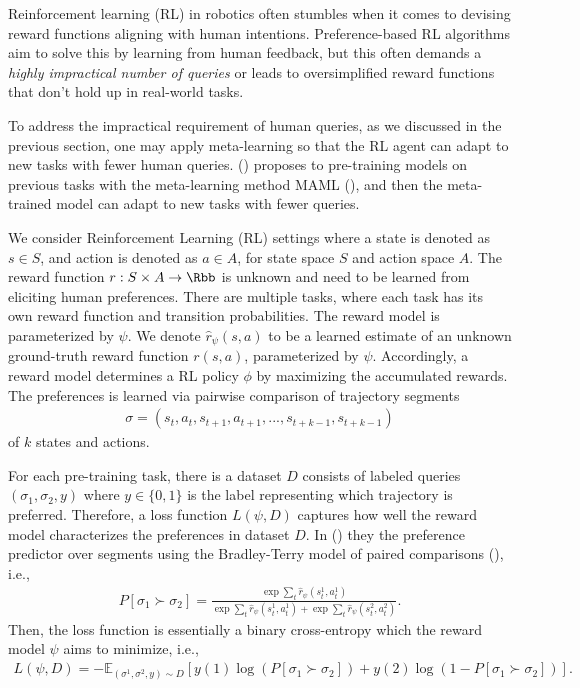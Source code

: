 \documentclass[
  letterpaper,
  DIV=11,
  numbers=noendperiod,
  oneside]{scrreprt}
\theoremstyle{remark}
\begin{document}
Reinforcement learning (RL) in robotics often stumbles when it comes to
devising reward functions aligning with human intentions.
Preference-based RL algorithms aim to solve this by learning from human
feedback, but this often demands a \emph{highly impractical number of
queries} or leads to oversimplified reward functions that don't hold up
in real-world tasks.

To address the impractical requirement of human queries, as we discussed
in the previous section, one may apply meta-learning so that the RL
agent can adapt to new tasks with fewer human queries.
() proposes to
pre-training models on previous tasks with the meta-learning method MAML
(), and then
the meta-trained model can adapt to new tasks with fewer queries.

We consider Reinforcement Learning (RL) settings where a state is
denoted as \(s\in S\), and action is denoted as \(a\in A\), for state
space \(S\) and action space \(A\). The reward function
\(r:S\times A \to \Rbb\) is unknown and need to be learned from
eliciting human preferences. There are multiple tasks, where each task
has its own reward function and transition probabilities. The reward
model is parameterized by \(\psi\). We denote \(\hat{r}_\psi(s,a)\) to
be a learned estimate of an unknown ground-truth reward function
\(r(s,a)\), parameterized by \(\psi\). Accordingly, a reward model
determines a RL policy \(\phi\) by maximizing the accumulated rewards.
The preferences is learned via pairwise comparison of trajectory
segments \[\begin{aligned}
    \sigma = (s_t, a_t, s_{t+1}, a_{t+1}, ..., s_{t+k-1}, s_{t+k-1})
\end{aligned}\] of \(k\) states and actions.

For each pre-training task, there is a dataset \(D\) consists of labeled
queries \((\sigma_1, \sigma_2, y)\) where \(y\in \{0, 1\}\) is the label
representing which trajectory is preferred. Therefore, a loss function
\(L(\psi, D)\) captures how well the reward model characterizes the
preferences in dataset \(D\). In () they the preference predictor over segments using the
Bradley-Terry model of paired comparisons
(), i.e.,
\[\begin{aligned}
    P[\sigma_1 \succ \sigma_2 ] = \frac{\exp \sum_t \hat{r}_\psi(s_t^{1}, a_t^{1})}{\exp \sum_t \hat{r}_\psi(s_t^{1}, a_t^{1}) + \exp \sum_t \hat{r}_\psi(s_t^{2}, a_t^{2})}.
\end{aligned}\] Then, the loss function is essentially a binary
cross-entropy which the reward model \(\psi\) aims to minimize, i.e.,
\[\begin{aligned}
    {L}(\psi,  {D}) = - \mathbb{E}_{(\sigma^1, \sigma^2, y) \sim {D}} \left[ y(1) \log (P[\sigma_1 \succ \sigma_2 ]) + y(2)\log(1 - P[\sigma_1 \succ \sigma_2 ]) \right].
\end{aligned}\]
\end{document}
